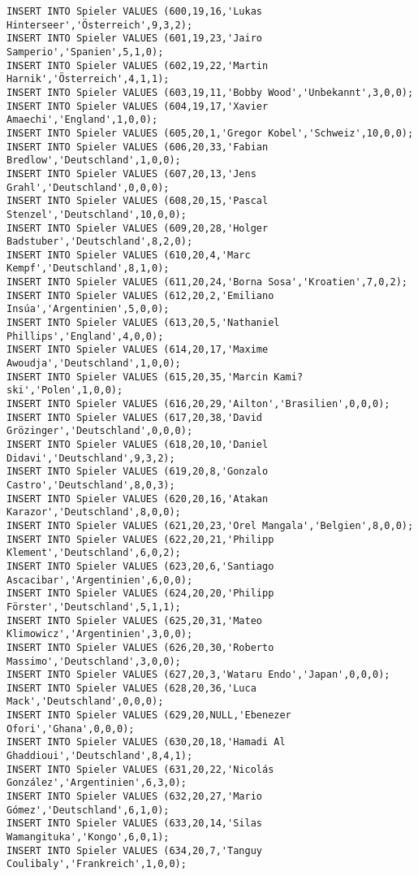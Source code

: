 \documentclass{lehramt-informatik-aufgabe}
\begin{document}
\begin{verbatim}
INSERT INTO Spieler VALUES (600,19,16,'Lukas Hinterseer','Österreich',9,3,2);
INSERT INTO Spieler VALUES (601,19,23,'Jairo Samperio','Spanien',5,1,0);
INSERT INTO Spieler VALUES (602,19,22,'Martin Harnik','Österreich',4,1,1);
INSERT INTO Spieler VALUES (603,19,11,'Bobby Wood','Unbekannt',3,0,0);
INSERT INTO Spieler VALUES (604,19,17,'Xavier Amaechi','England',1,0,0);
INSERT INTO Spieler VALUES (605,20,1,'Gregor Kobel','Schweiz',10,0,0);
INSERT INTO Spieler VALUES (606,20,33,'Fabian Bredlow','Deutschland',1,0,0);
INSERT INTO Spieler VALUES (607,20,13,'Jens Grahl','Deutschland',0,0,0);
INSERT INTO Spieler VALUES (608,20,15,'Pascal Stenzel','Deutschland',10,0,0);
INSERT INTO Spieler VALUES (609,20,28,'Holger Badstuber','Deutschland',8,2,0);
INSERT INTO Spieler VALUES (610,20,4,'Marc Kempf','Deutschland',8,1,0);
INSERT INTO Spieler VALUES (611,20,24,'Borna Sosa','Kroatien',7,0,2);
INSERT INTO Spieler VALUES (612,20,2,'Emiliano Insúa','Argentinien',5,0,0);
INSERT INTO Spieler VALUES (613,20,5,'Nathaniel Phillips','England',4,0,0);
INSERT INTO Spieler VALUES (614,20,17,'Maxime Awoudja','Deutschland',1,0,0);
INSERT INTO Spieler VALUES (615,20,35,'Marcin Kami?ski','Polen',1,0,0);
INSERT INTO Spieler VALUES (616,20,29,'Ailton','Brasilien',0,0,0);
INSERT INTO Spieler VALUES (617,20,38,'David Grözinger','Deutschland',0,0,0);
INSERT INTO Spieler VALUES (618,20,10,'Daniel Didavi','Deutschland',9,3,2);
INSERT INTO Spieler VALUES (619,20,8,'Gonzalo Castro','Deutschland',8,0,3);
INSERT INTO Spieler VALUES (620,20,16,'Atakan Karazor','Deutschland',8,0,0);
INSERT INTO Spieler VALUES (621,20,23,'Orel Mangala','Belgien',8,0,0);
INSERT INTO Spieler VALUES (622,20,21,'Philipp Klement','Deutschland',6,0,2);
INSERT INTO Spieler VALUES (623,20,6,'Santiago Ascacibar','Argentinien',6,0,0);
INSERT INTO Spieler VALUES (624,20,20,'Philipp Förster','Deutschland',5,1,1);
INSERT INTO Spieler VALUES (625,20,31,'Mateo Klimowicz','Argentinien',3,0,0);
INSERT INTO Spieler VALUES (626,20,30,'Roberto Massimo','Deutschland',3,0,0);
INSERT INTO Spieler VALUES (627,20,3,'Wataru Endo','Japan',0,0,0);
INSERT INTO Spieler VALUES (628,20,36,'Luca Mack','Deutschland',0,0,0);
INSERT INTO Spieler VALUES (629,20,NULL,'Ebenezer Ofori','Ghana',0,0,0);
INSERT INTO Spieler VALUES (630,20,18,'Hamadi Al Ghaddioui','Deutschland',8,4,1);
INSERT INTO Spieler VALUES (631,20,22,'Nicolás González','Argentinien',6,3,0);
INSERT INTO Spieler VALUES (632,20,27,'Mario Gómez','Deutschland',6,1,0);
INSERT INTO Spieler VALUES (633,20,14,'Silas Wamangituka','Kongo',6,0,1);
INSERT INTO Spieler VALUES (634,20,7,'Tanguy Coulibaly','Frankreich',1,0,0);

\end{verbatim}
\end{document}
